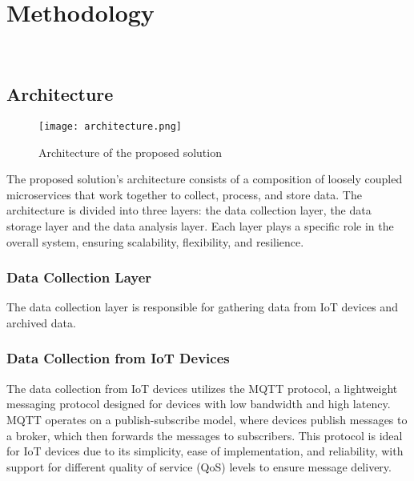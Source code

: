 \chapter{Methodology}
\label{cap:method}

\\


\section{Architecture}
\label{sec:architecture}

\begin{figure}[htbp]
    \centering
    \texttt{[image: architecture.png]}
    \caption{Architecture of the proposed solution}
\end{figure}

The proposed solution's architecture consists of a composition of loosely coupled microservices that work together to collect, process, and store data. The architecture is divided into three layers: the data collection layer, the data storage layer and the data analysis layer. Each layer plays a specific role in the overall system, ensuring scalability, flexibility, and resilience.

\subsection{Data Collection Layer}

The data collection layer is responsible for gathering data from IoT devices and archived data. 

\subsection{Data Collection from IoT Devices}

The data collection from IoT devices utilizes the MQTT protocol, a lightweight messaging protocol designed for devices with low bandwidth and high latency. MQTT operates on a publish-subscribe model, where devices publish messages to a broker, which then forwards the messages to subscribers. This protocol is ideal for IoT devices due to its simplicity, ease of implementation, and reliability, with support for different quality of service (QoS) levels to ensure message delivery.

